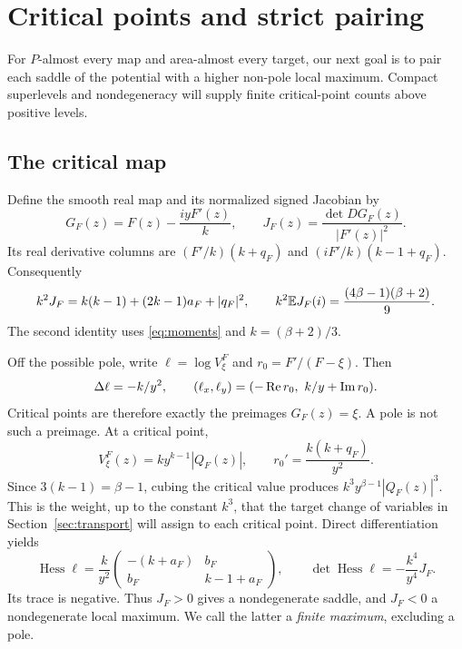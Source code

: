 \section{Critical points and strict pairing}\label{sec:pairing}

For \(P\)-almost every map and area-almost every target, our next goal is to pair
each saddle of the potential with a higher non-pole local maximum.
Compact superlevels and nondegeneracy will supply finite critical-point
counts above positive levels.

\subsection{The critical map}

Define the smooth real map and its normalized signed Jacobian by
\begin{equation}\label{eq:G}
 G_F(z)=F(z)-\frac{iyF'(z)}k,\qquad
 J_F(z)=\frac{\det DG_F(z)}{|F'(z)|^2}.
\end{equation}
Its real derivative columns are
\((F'/k)(k+q_F)\) and \((iF'/k)(k-1+q_F)\).
Consequently
\begin{equation}\label{eq:Jacobian}
 k^2J_F=k(k-1)+(2k-1)a_F+|q_F|^2,\qquad
 k^2\mathbb E J_F(i)=\frac{(4\beta-1)(\beta+2)}9.
\end{equation}
The second identity uses \eqref{eq:moments} and \(k=(\beta+2)/3\).

Off the possible pole, write \(\ell=\log V_\xi^F\) and
\(r_0=F'/(F-\xi)\). Then
\[
 \Delta\ell=-k/y^2,\qquad
 (\ell_x,\ell_y)=(-\operatorname{Re} r_0,\ k/y+\operatorname{Im} r_0).
\]
Critical points are therefore exactly the preimages \(G_F(z)=\xi\).
A pole is not such a preimage. At a critical point,
\begin{equation}\label{eq:critical-value}
 V_\xi^F(z)=k y^{k-1}|Q_F(z)|,\qquad
 r_0'=\frac{k(k+q_F)}{y^2}.
\end{equation}
Since \(3(k-1)=\beta-1\), cubing the critical value produces
\(k^3y^{\beta-1}|Q_F(z)|^3\). This is the weight, up to the constant
\(k^3\), that the target change of variables in
Section~\ref{sec:transport} will assign to each critical point.
Direct differentiation yields
\begin{equation}\label{eq:hessian}
 \operatorname{Hess}\ell
 =\frac{k}{y^2}
 \begin{pmatrix}-(k+a_F)&b_F\\b_F&k-1+a_F\end{pmatrix},
 \qquad
 \det\operatorname{Hess}\ell=-\frac{k^4}{y^4}J_F.
\end{equation}
Its trace is negative. Thus \(J_F>0\) gives a nondegenerate saddle,
and \(J_F<0\) a nondegenerate local maximum. We call the latter
a \emph{finite maximum}, excluding a pole.

